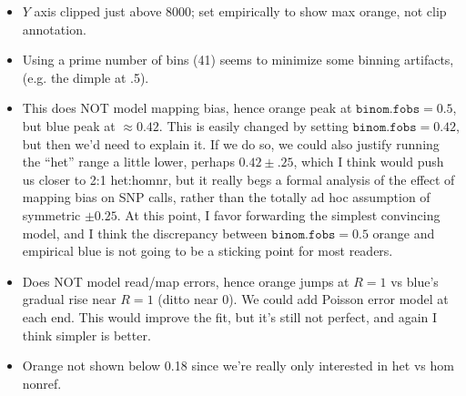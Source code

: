 \documentclass{article}\usepackage[]{graphicx}\usepackage[]{color}
\begin{document}
\begin{itemize}
  \item $Y$ axis clipped just above 8000; set empirically to show max orange, not clip annotation.
  \item Using a prime number of bins (41) seems to minimize some binning artifacts, (e.g. the dimple at .5). 
  \item This does NOT model mapping bias, hence orange peak at $\texttt{binom.fobs}=0.5$, but blue peak at $\approx 0.42$.  This is easily changed by setting $\texttt{binom.fobs}=0.42$, but then we'd need to explain it.  If we do so, we could also justify running the ``het'' range a little lower, perhaps $0.42 \pm .25$, which I think would push us closer to 2:1 het:homnr, but it really begs a formal analysis of the effect of mapping bias on SNP calls, rather than the totally ad hoc assumption of symmetric $\pm 0.25$.  At this point, I favor forwarding the simplest convincing model, and I think the discrepancy between $\texttt{binom.fobs}=0.5$ orange and empirical blue is not going to be a sticking point for most readers.
  \item Does NOT model read/map errors, hence orange jumps at $R = 1$  vs blue's gradual rise near $R=1$ (ditto near 0).  We could add Poisson error model at each end.  This would improve the fit, but it's still not perfect, and again I think simpler is better.
  \item Orange not shown below 0.18 since we’re really only interested in het vs hom nonref.
\end{itemize}
\end{document}
